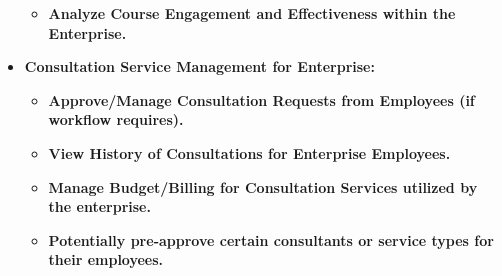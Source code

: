 \documentclass[12pt, a4paper]{report} %
\begin{document}
\begin{itemize}
\begin{itemize}
            \item \textbf{Analyze Course Engagement and Effectiveness within the Enterprise.}
        \end{itemize}
    \item \textbf{Consultation Service Management for Enterprise:}
        \begin{itemize}
            \item \textbf{Approve/Manage Consultation Requests from Employees (if workflow requires).}
            \item \textbf{View History of Consultations for Enterprise Employees.}
            \item \textbf{Manage Budget/Billing for Consultation Services utilized by the enterprise.}
            \item \textbf{Potentially pre-approve certain consultants or service types for their employees.}
        \end{itemize}
  \end{itemize}
\end{document}

